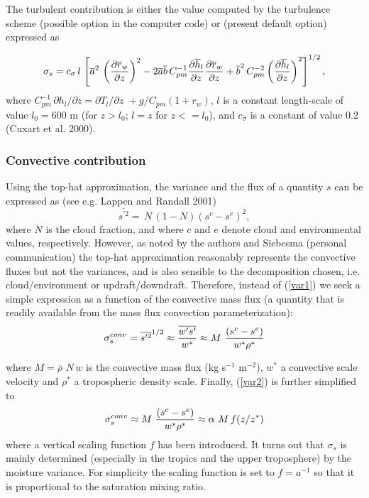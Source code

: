 The turbulent contribution is either the value computed by the turbulence scheme
(possible option in the computer code) or (present default option) expressed as

\begin{equation}
\sigma_s  = c_\sigma\,l\, \left[
\overline{a}^2\,\left({\partial\overline{r}_w\over\partial z}\right)^2
-  2\overline{a}\overline{b}\, C_{pm}^{-1}
{\partial\overline{h}_l\over\partial z}
{\partial\overline{r}_w\over\partial z}
 + \overline{b}^2 \, C_{pm}^{-2}
\left({\partial\overline{h}_l\over\partial z}\right)^2\right]^{1/2},
\label{eqsp}
\end{equation}
\noindent
where $C_{pm}^{-1}\,\partial h_l/\partial z=\partial T_l/\partial z\,\,+g/C_{pm} (1+r_w)$, 
$l$ is a constant length-scale of value $l_0=600$ m  (for $z>l_0$; $l=z$ for $z<=l_0$), and
$c_\sigma$ is a constant of value 0.2 (Cuxart et al. 2000).

\subsubsection{Convective contribution}

Using the top-hat approximation, the variance and the flux of a quantity $s$ can be
expressed as (see e.g. Lappen and Randall  2001)
\begin{equation}
\overline{s^{\prime 2}}=\,N\,(1-N) (s^c -s^e)^2\label{var1},
\end{equation}
\noindent where $N$ is the cloud fraction,  and
where $c$ and $e$ denote cloud and environmental values, respectively. 
However, as noted by the authors and Siebesma (personal communication) the top-hat
approximation reasonably represents  the convective fluxes but not the variances, and is also sensible
to the decomposition chosen, i.e. cloud/environment or updraft/downdraft.
Therefore, instead of (\ref{var1}) we seek a simple expression as a function of
the convective mass flux (a quantity that is readily available from the mass flux convection
parameterization):
\begin{equation}
\sigma_s^{conv}=\overline{s^{\prime 2}}^{1/2}\approx {\overline{w^\prime s^\prime }\over w^*}
\approx M\,\,{(s^c -s^e)\over w^* \rho^*}\label{var2}
\end{equation}

\noindent where $M=\overline{\rho}\,\, N\,w$ is the convective
mass flux (kg s$^{-1}$ m$^{-2}$), $w^*$ a convective scale velocity and 
$\rho^*$ a tropospheric density scale. Finally, (\ref{var2}) is further simplified to
\begin{equation}
\sigma_s^{conv}\approx  M\,\,{(s^c -s^e)\over w^* \rho^*} \approx \alpha\,\,M\,f(z/z^*)\label{var3}
\end{equation}
where  a vertical scaling function $f$ has been introduced.
It turns out that $\sigma_s$ is mainly determined (especially in the tropics and the upper troposphere)
by the moisture variance. For simplicity
  the scaling function is set to $f=a^{-1}$ so that it is proportional to the
saturation mixing ratio.


